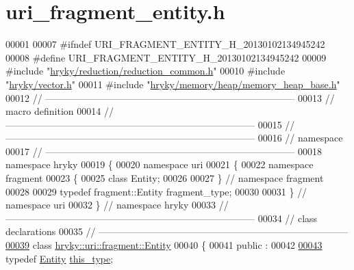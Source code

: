 \hypertarget{uri__fragment__entity_8h_source}{\section{uri\-\_\-fragment\-\_\-entity.\-h}
}

\begin{DoxyCode}
00001 
00007 \textcolor{preprocessor}{#ifndef URI\_FRAGMENT\_ENTITY\_H\_20130102134945242}
00008 \textcolor{preprocessor}{}\textcolor{preprocessor}{#define URI\_FRAGMENT\_ENTITY\_H\_20130102134945242}
00009 \textcolor{preprocessor}{}\textcolor{preprocessor}{#include "\hyperlink{reduction__common_8h}{hryky/reduction/reduction_common.h}"}
00010 \textcolor{preprocessor}{#include "\hyperlink{vector_8h}{hryky/vector.h}"}
00011 \textcolor{preprocessor}{#include "\hyperlink{memory__heap__base_8h}{hryky/memory/heap/memory_heap_base.h}"}
00012 \textcolor{comment}{//
      ------------------------------------------------------------------------------}
00013 \textcolor{comment}{// macro definition}
00014 \textcolor{comment}{//
      ------------------------------------------------------------------------------}
00015 \textcolor{comment}{//
      ------------------------------------------------------------------------------}
00016 \textcolor{comment}{// namespace}
00017 \textcolor{comment}{//
      ------------------------------------------------------------------------------}
00018 \textcolor{keyword}{namespace }hryky
00019 \{
00020 \textcolor{keyword}{namespace }uri
00021 \{
00022 \textcolor{keyword}{namespace }fragment
00023 \{
00025     \textcolor{keyword}{class }Entity;
00026 
00027 \} \textcolor{comment}{// namespace fragment}
00028 
00029 \textcolor{keyword}{typedef} fragment::Entity fragment\_type;
00030 
00031 \} \textcolor{comment}{// namespace uri}
00032 \} \textcolor{comment}{// namespace hryky}
00033 \textcolor{comment}{//
      ------------------------------------------------------------------------------}
00034 \textcolor{comment}{// class declarations}
00035 \textcolor{comment}{//
      ------------------------------------------------------------------------------}
\hypertarget{uri__fragment__entity_8h_source_l00039}{}\hyperlink{classhryky_1_1uri_1_1fragment_1_1_entity}{00039} \textcolor{comment}{}\textcolor{keyword}{class }\hyperlink{classhryky_1_1uri_1_1fragment_1_1_entity}{hryky::uri::fragment::Entity}
00040 \{
00041 \textcolor{keyword}{public} :
00042 
\hypertarget{uri__fragment__entity_8h_source_l00043}{}\hyperlink{classhryky_1_1uri_1_1fragment_1_1_entity_a1432f388492da6f28248b977b9402102}{00043}     \textcolor{keyword}{typedef} \hyperlink{classhryky_1_1uri_1_1fragment_1_1_entity}{Entity} \hyperlink{classhryky_1_1uri_1_1fragment_1_1_entity_a1432f388492da6f28248b977b9402102}{this_type};

\end{DoxyCode}
